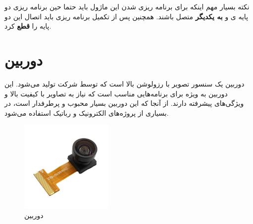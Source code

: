 نکته بسیار مهم اینکه برای برنامه ریزی شدن این ماژول باید حتما حین برنامه ریزی دو پایه ی
و
\textbf{به یکدیگر}
متصل باشند. همچنین پس از تکمیل برنامه ریزی باید اتصال این دو پایه را
\textbf{قطع}
کرد.
\section{دوربین }
دوربین  یک سنسور تصویر  با رزولوشن بالا است که توسط شرکت  تولید می‌شود. این دوربین به ویژه برای برنامه‌هایی مناسب است که نیاز به تصاویر با کیفیت بالا و ویژگی‌های پیشرفته دارند. از آنجا که این دوربین بسیار محبوب و پرطرفدار است، در بسیاری از پروژه‌های الکترونیک و رباتیک استفاده می‌شود.


\begin{figure}[H]
	\centering
	\includegraphics[width=0.4\textwidth]{./images/Chapter4/OV2640}
	\caption[دوربین ]{دوربین  \cite{OV2640}}
	\label{عکس دوربین}
\end{figure}

